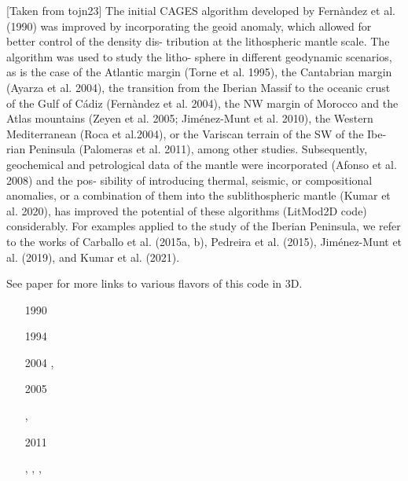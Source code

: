 [Taken from tojn23]
The initial CAGES algorithm developed by Fernàndez et al. (1990) was improved by
incorporating the geoid anomaly, which allowed for better control of the density dis-
tribution at the lithospheric mantle scale. The algorithm was used to study the litho-
sphere in different geodynamic scenarios, as is the case of the Atlantic margin (Torne
et al. 1995), the Cantabrian margin (Ayarza et al. 2004), the transition from the Iberian
Massif to the oceanic crust of the Gulf of Cádiz (Fernàndez et al. 2004), the NW margin
of Morocco and the Atlas mountains (Zeyen et al. 2005; Jiménez-Munt et al. 2010), the
Western Mediterranean (Roca et al.2004), or the Variscan terrain of the SW of the Ibe-
rian Peninsula (Palomeras et al. 2011), among other studies. Subsequently, geochemical
and petrological data of the mantle were incorporated (Afonso et al. 2008) and the pos-
sibility of introducing thermal, seismic, or compositional anomalies, or a combination
of them into the sublithospheric mantle (Kumar et al. 2020), has improved the potential
of these algorithms (LitMod2D code) considerably. For examples applied to the study of
the Iberian Peninsula, we refer to the works of Carballo et al. (2015a, b), Pedreira et al.
(2015), Jiménez-Munt et al. (2019), and Kumar et al. (2021).

See paper for more links to various flavors of this code in 3D.



\begin{small}
\begin{itemize}
\item[1990] \textcite{fetz90}
\item[1994] \textcite{zefe94}
\item[2004] \textcite{ayma04}, \textcite{femt04}
\item[2005] \textcite{zeaf05}
\item[\twothousandseven]      \textcite{afrf07}
\item[\twothousandeight]      \textcite{affr08}
\item[\twothousandnine]       \textcite{fuac09}
\item[\twothousandten]        \textcite{fufa10}, \textcite{jifv10}
\item[2011] \textcite{paca11}
\item[\twothousandnineteen]   \textcite{jitf19}
\item[\twothousandfifteen]    \textcite{fucn15}, \textcite{caft15}, \textcite{cafj15},
                              \textcite{peap15}
\item[\twothousandtwenty]     \textcite{kufj20}
\item[\twothousandtwentyone]  \textcite{kufv21}
\item[\twothousandtwentytwo]  \textcite{zhjt22}
\item[\twothousandtwentythree]\textcite{tojn23}
\item[\twothousandtwentyfour] \textcite{zhjt24}
\end{itemize}
\end{small}


